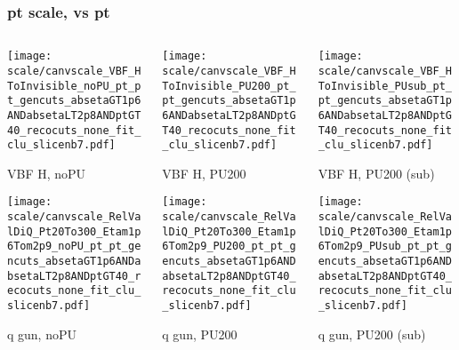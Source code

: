 \documentclass[8pt]{beamer}
\begin{document}
 \begin{frame}
  \frametitle{pt scale, vs pt}
  
  \begin{columns}
   \begin{column}{0.35\textwidth}
     \texttt{[image: scale/canvscale\_VBF\_HToInvisible\_noPU\_pt\_pt\_gencuts\_absetaGT1p6ANDabsetaLT2p8ANDptGT40\_recocuts\_none\_fit\_clu\_slicenb7.pdf]}
     
     VBF H, noPU
    
     \texttt{[image: scale/canvscale\_RelValDiQ\_Pt20To300\_Etam1p6Tom2p9\_noPU\_pt\_pt\_gencuts\_absetaGT1p6ANDabsetaLT2p8ANDptGT40\_recocuts\_none\_fit\_clu\_slicenb7.pdf]}
     
     q gun, noPU
   \end{column}
   \begin{column}{0.35\textwidth}
     \texttt{[image: scale/canvscale\_VBF\_HToInvisible\_PU200\_pt\_pt\_gencuts\_absetaGT1p6ANDabsetaLT2p8ANDptGT40\_recocuts\_none\_fit\_clu\_slicenb7.pdf]}
     
     VBF H, PU200
    
     \texttt{[image: scale/canvscale\_RelValDiQ\_Pt20To300\_Etam1p6Tom2p9\_PU200\_pt\_pt\_gencuts\_absetaGT1p6ANDabsetaLT2p8ANDptGT40\_recocuts\_none\_fit\_clu\_slicenb7.pdf]}
     
     q gun, PU200
   \end{column}
   \begin{column}{0.35\textwidth}
     \texttt{[image: scale/canvscale\_VBF\_HToInvisible\_PUsub\_pt\_pt\_gencuts\_absetaGT1p6ANDabsetaLT2p8ANDptGT40\_recocuts\_none\_fit\_clu\_slicenb7.pdf]}
     
     VBF H, PU200 (sub)
    
     \texttt{[image: scale/canvscale\_RelValDiQ\_Pt20To300\_Etam1p6Tom2p9\_PUsub\_pt\_pt\_gencuts\_absetaGT1p6ANDabsetaLT2p8ANDptGT40\_recocuts\_none\_fit\_clu\_slicenb7.pdf]}
     
     q gun, PU200 (sub)
   \end{column}
  \end{columns}
 \end{frame}
 
\end{document}
